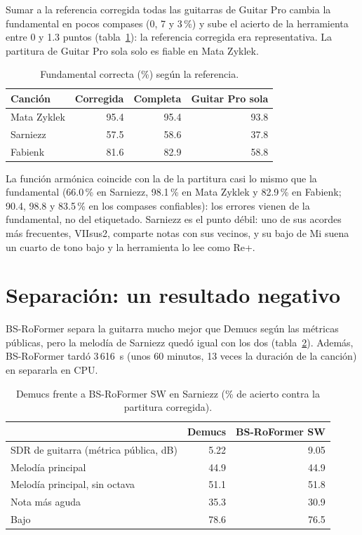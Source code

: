 Sumar a la referencia corregida todas las guitarras de Guitar Pro cambia la fundamental en pocos compases (0, 7 y 3\,\%) y
sube el acierto de la herramienta entre 0 y 1.3 puntos (tabla~\ref{tab:ref-completa}): la referencia corregida era
representativa. La partitura de Guitar Pro sola solo es fiable en Mata Zyklek.

\begin{table}[ht]
  \centering
  \caption{Fundamental correcta (\%) según la referencia.}\label{tab:ref-completa}
  \begin{tabular}{@{}lrrr@{}}
    \toprule
    Canción & Corregida & Completa & Guitar Pro sola \\
    \midrule
    Mata Zyklek & 95.4 & 95.4 & 93.8 \\
    Sarniezz & 57.5 & 58.6 & 37.8 \\
    Fabienk & 81.6 & 82.9 & 58.8 \\
    \bottomrule
  \end{tabular}
\end{table}

La función armónica coincide con la de la partitura casi lo mismo que la fundamental (66.0\,\% en Sarniezz, 98.1\,\% en Mata
Zyklek y 82.9\,\% en Fabienk; 90.4, 98.8 y 83.5\,\% en los compases confiables): los errores vienen de la fundamental, no
del etiquetado. Sarniezz es el punto débil: uno de sus acordes más frecuentes, \fl VIIsus2, comparte notas con sus vecinos, y su bajo de
Mi suena un cuarto de tono bajo y la herramienta lo lee como Re\sh+.

\section{Separación: un resultado negativo}\label{sec:res-separacion}

BS-RoFormer separa la guitarra mucho mejor que Demucs según las métricas públicas, pero la melodía de Sarniezz quedó igual
con los dos (tabla~\ref{tab:separacion}). Además, BS-RoFormer tardó 3\,616~s (unos 60 minutos, 13 veces la duración de la
canción) en separarla en CPU.

\begin{table}[ht]
  \centering
  \caption{Demucs frente a BS-RoFormer SW en Sarniezz (\% de acierto contra la partitura corregida).}\label{tab:separacion}
  \begin{tabular}{@{}lrr@{}}
    \toprule
    & Demucs & BS-RoFormer SW \\
    \midrule
    SDR de guitarra (métrica pública, dB) & 5.22 & 9.05 \\
    Melodía principal & 44.9 & 44.9 \\
    Melodía principal, sin octava & 51.1 & 51.8 \\
    Nota más aguda & 35.3 & 30.9 \\
    Bajo & 78.6 & 76.5 \\
    \bottomrule
  \end{tabular}
\end{table}

